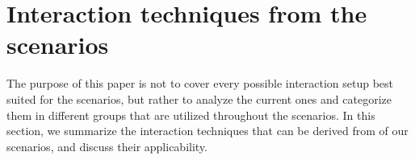 \documentclass[review,journal]{vgtc}         %
\begin{document}








\section{Interaction techniques from the scenarios} \label{sec:techniques}
The purpose of this paper is not to cover every possible interaction setup best suited for the scenarios, but rather to analyze the current ones and categorize them in different groups that are utilized throughout the scenarios.
In this section, we summarize the interaction techniques that can be derived from of our scenarios, and discuss their applicability.
\end{document}
